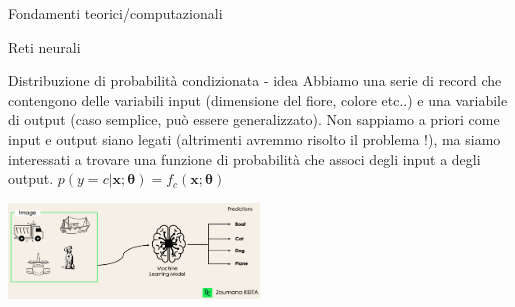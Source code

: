 \documentclass[11pt]{beamer}
\begin{document}
\begin{frame}
\begin{center}
\Huge
Fondamenti teorici/computazionali
\end{center}
\end{frame}


\begin{frame}{Reti neurali \cite{pml1Book,pml2Book,classification_datacamp}}

\begin{alertblock}{Distribuzione di probabilità condizionata - idea }
Abbiamo una serie di record che contengono delle variabili  input (dimensione del fiore, colore etc..) e una variabile di output (caso semplice, può essere generalizzato). Non sappiamo a priori come input e output siano legati (altrimenti avremmo risolto il problema !), ma siamo interessati a trovare una funzione di probabilità che associ degli input a degli output. $p(y=c|\textbf{x};\bm{\theta})=f_{c}(\textbf{x};\bm{\theta})$
\end{alertblock}


\begin{center}
\includegraphics[width=0.5\textwidth]{Pic/4_label_classification_task_Datacamp.png}
\end{center}


\end{frame}
\end{document}
